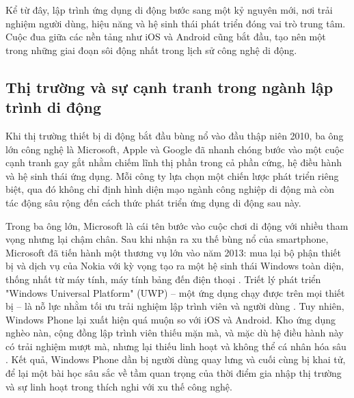   \begin{flushleft}
  \hspace*{0.8cm}Kể từ đây, lập trình ứng dụng di động bước sang một kỷ nguyên mới, nơi trải nghiệm người dùng, hiệu năng và hệ sinh thái phát triển đóng vai trò trung tâm. Cuộc đua giữa các nền tảng như iOS và Android cũng bắt đầu, tạo nên một trong những giai đoạn sôi động nhất trong lịch sử công nghệ di động.
  \end{flushleft}

\subsection{Thị trường và sự cạnh tranh trong ngành lập trình di động}
\renewcommand{\labelitemi}{--}    
    \begin{flushleft}
        \hspace*{0.8cm}Khi thị trường thiết bị di động bắt đầu bùng nổ vào đầu thập niên 2010, ba ông lớn công nghệ là Microsoft, Apple và Google đã nhanh chóng bước vào một cuộc cạnh tranh gay gắt nhằm chiếm lĩnh thị phần trong cả phần cứng, hệ điều hành và hệ sinh thái ứng dụng. Mỗi công ty lựa chọn một chiến lược phát triển riêng biệt, qua đó không chỉ định hình diện mạo ngành công nghiệp di động mà còn tác động sâu rộng đến cách thức phát triển ứng dụng di động sau này.
    \end{flushleft}

    \begin{flushleft}
      \hspace*{0.8cm}Trong ba ông lớn, Microsoft là cái tên bước vào cuộc chơi di động với nhiều tham vọng nhưng lại chậm chân. Sau khi nhận ra xu thế bùng nổ của smartphone, Microsoft đã tiến hành một thương vụ lớn vào năm 2013: mua lại bộ phận thiết bị và dịch vụ của Nokia với kỳ vọng tạo ra một hệ sinh thái Windows toàn diện, thống nhất từ máy tính, máy tính bảng đến điện thoại \cite{msft-nokia}. Triết lý phát triển "Windows Universal Platform" (UWP) – một ứng dụng chạy được trên mọi thiết bị – là nỗ lực nhằm tối ưu trải nghiệm lập trình viên và người dùng \cite{uwp-overview}. Tuy nhiên, Windows Phone lại xuất hiện quá muộn so với iOS và Android. Kho ứng dụng nghèo nàn, cộng đồng lập trình viên thiếu mặn mà, và mặc dù hệ điều hành này có trải nghiệm mượt mà, nhưng lại thiếu linh hoạt và không thể cá nhân hóa sâu \cite{windows-phone-fail}. Kết quả, Windows Phone dần bị người dùng quay lưng và cuối cùng bị khai tử, để lại một bài học sâu sắc về tầm quan trọng của thời điểm gia nhập thị trường và sự linh hoạt trong thích nghi với xu thế công nghệ.
    \end{flushleft}

